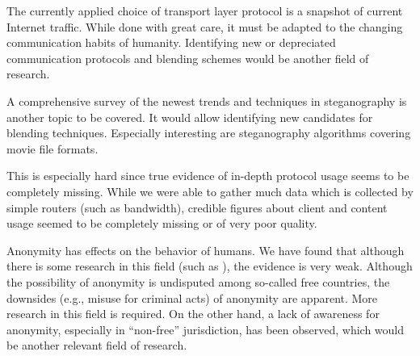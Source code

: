 The currently applied choice of transport layer protocol is a snapshot of current Internet traffic. While done with great care, it must be adapted to the changing communication habits of humanity. Identifying new or depreciated communication protocols and blending schemes would be another field of research.

A comprehensive survey of the newest trends and techniques in steganography is another topic to be covered. It would allow identifying new candidates for blending techniques. Especially interesting are steganography algorithms covering movie file formats.

This is especially hard since true evidence of in-depth protocol usage seems to be completely missing. While we were able to gather much data which is collected by simple routers (such as bandwidth), credible figures about client and content usage seemed to be completely missing or of very poor quality.

Anonymity has effects on the behavior of humans. We have found that although there is some research in this field (such as \cite{postmes2001social}), the evidence is very weak. Although the possibility of anonymity is undisputed among so-called free countries, the downsides (e.g., misuse for criminal acts) of anonymity are apparent. More research in this field is required. On the other hand, a lack of awareness for anonymity, especially in ``non-free'' jurisdiction, has been observed, which would be another relevant field of research. 
